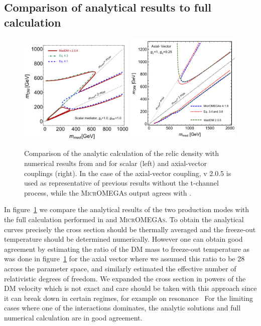 \subsection{Comparison of analytical results to full calculation}

\begin{center}
\begin{figure}[h]
\includegraphics[width=0.49\textwidth]{figures/scalar_mediator_omegah2.pdf}
\includegraphics[width=0.49\textwidth]{figures/AV_comparison2.pdf} 
\caption{Comparison of the analytic calculation of the relic density with numerical results from \maddm and for scalar (left) and axial-vector couplings (right). In the case of the axial-vector coupling, \maddm v 2.0.5 is used as representative of previous results without the t-channel process, while the \textsc{MicrOMEGAs} output agrees with \maddm.}
\label{fig:analcalc}
\end{figure}
\end{center}

In figure~\ref{fig:analcalc} we compare the analytical results of the two production modes with the full calculation performed in \maddm and \textsc{MicrOMEGAs}.
To obtain the analytical curves precisely the cross section should be thermally averaged and the freeze-out temperature should be determined numerically. However one can obtain good agreement by estimating the ratio of the DM mass to freeze-out temperature as was done in figure~\ref{fig:analcalc} for the axial vector where we assumed this ratio to be 28 across the parameter space, and similarly estimated the effective number of relativistic degrees of freedom. We expanded the cross section in powers of the DM velocity which is not exact and care should be taken with this approach since it can break down in certain regimes, for example on resonance~\cite{Gondolo:1990dk}
For the limiting cases where one of the interactions dominates, the analytic solutions and full numerical calculation are in good agreement. 





